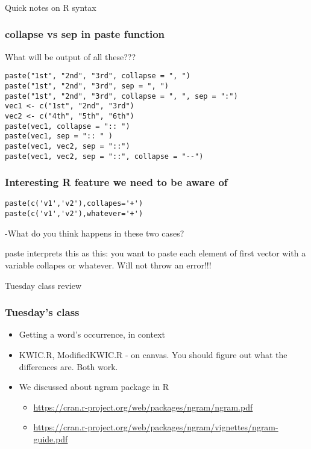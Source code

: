 \documentclass{beamer}
\begin{document}
\begin{frame}
\frametitle{}
\centering
\Large Quick notes on R syntax
\end{frame}

\begin{frame}[fragile]
\frametitle{collapse vs sep in paste function}
What will be output of all these???
\footnotesize
\begin{verbatim}
paste("1st", "2nd", "3rd", collapse = ", ")
paste("1st", "2nd", "3rd", sep = ", ")
paste("1st", "2nd", "3rd", collapse = ", ", sep = ":")
vec1 <- c("1st", "2nd", "3rd")
vec2 <- c("4th", "5th", "6th")
paste(vec1, collapse = ":: ")
paste(vec1, sep = ":: " )
paste(vec1, vec2, sep = "::")
paste(vec1, vec2, sep = "::", collapse = "--")
\end{verbatim}
\end{frame}

\begin{frame}[fragile]
\frametitle{Interesting R feature we need to be aware of}
\begin{verbatim}
paste(c('v1','v2'),collapes='+')
paste(c('v1','v2'),whatever='+')
\end{verbatim}
-What do you think happens in these two cases? \pause

paste interprets this as this: you want to paste each element of first vector with a variable collapes or whatever. Will not throw an error!!!
\end{frame}

\begin{frame}
\Large Tuesday class review
\end{frame}

\begin{frame}
\frametitle{Tuesday's class}
\begin{itemize}
\item Getting a word's occurrence, in context
\item KWIC.R, ModifiedKWIC.R - on canvas. You should figure out what the differences are. Both work.
\item We discussed about ngram package in R
\begin{itemize}
\item \tiny \url{https://cran.r-project.org/web/packages/ngram/ngram.pdf}
\item \tiny \url{https://cran.r-project.org/web/packages/ngram/vignettes/ngram-guide.pdf}
\end{itemize}
\end{itemize}
\end{frame}
\end{document}
